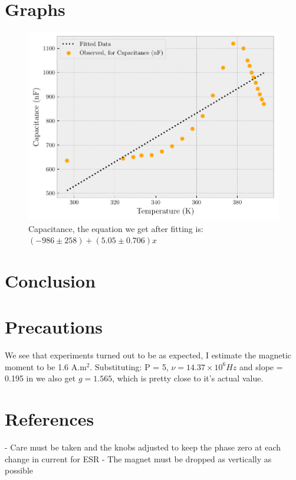 \documentclass{double}
\begin{document}
\section{Graphs}
\begin{figure}[H]
\centering
\includegraphics[width = \columnwidth]{./0Capacitance0.pdf}
\caption{Capacitance, the equation we get after fitting is: $(-986 \pm 258) + (5.05 \pm 0.706)x$}
\label{fig:"capacitance"}
\end{figure}
\section{Conclusion}



\section{Precautions}
We see that experiments turned out to be as expected, I estimate the magnetic moment to be 1.6 A.m$^2$. Substituting: P = 5, $\nu = 14.37 \times 10^6 Hz$ and slope = 0.195 in we also get $g = 1.565$, which is pretty close to it's actual value.

\section{References}
- Care must be taken and the knobs adjusted to keep the phase zero at each change in current for ESR
- The magnet must be dropped as vertically as possible
\nocite{*}
\printbibliography[heading=none]
\clearpage
\end{document}
